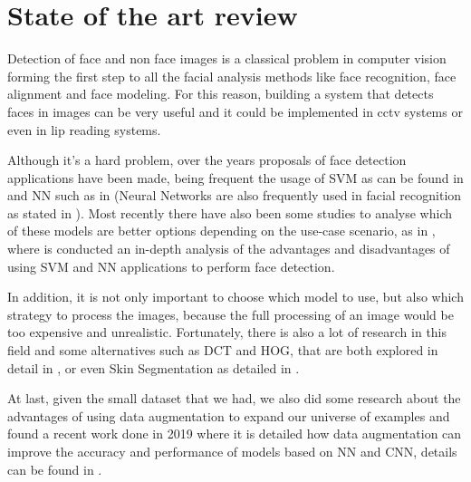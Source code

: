 \section{State of the art review} \label{soa}
Detection of face and non face images is a classical problem in computer vision forming the first step to all the facial analysis methods like face recognition, face alignment and face modeling. 
For this reason, building a system that detects faces in images can be very useful and it could be implemented in cctv systems or even in lip reading systems.

Although it's a hard problem, over the years proposals of face detection applications have been made, being frequent the usage of SVM as can be found in \cite{1619082, 609310} and NN such as in \cite{5233453, 8300832} (Neural Networks are also frequently used in facial recognition as stated in \cite{8300832}). Most recently there have also been some studies to analyse which of these models are better options depending on the use-case scenario, as in \cite{7943228}, where is conducted an in-depth analysis of the advantages and disadvantages of using SVM and NN applications to perform face detection. 

In addition, it is not only important to choose which model to use, but also which strategy to process the images, because the full processing of an image would be too expensive and unrealistic. Fortunately, there is also a lot of research in this field and some alternatives such as DCT and HOG, that are both explored in detail in \cite{7467714}, or even Skin Segmentation as detailed in \cite{5076875}.

At last, given the small dataset that we had, we also did some research about the advantages of using data augmentation to expand our universe of examples and found a recent work done in 2019 where it is detailed how data augmentation can improve the accuracy and performance of models based on NN and CNN, details can be found in \cite{8858529}.